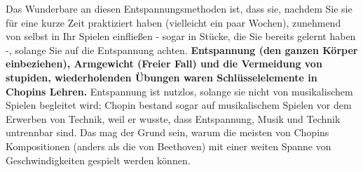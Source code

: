 Das Wunderbare an diesen Entspannungsmethoden ist, dass sie, nachdem Sie sie für eine kurze Zeit praktiziert haben (vielleicht ein paar Wochen), zunehmend von selbst in Ihr Spielen einfließen - sogar in Stücke, die Sie bereits gelernt haben -, solange Sie auf die Entspannung achten.
\textbf{Entspannung (den ganzen Körper einbeziehen), Armgewicht (Freier Fall) und die Vermeidung von stupiden, wiederholenden Übungen waren Schlüsselelemente in Chopins Lehren.}
Entspannung ist nutzlos, solange sie nicht von musikalischem Spielen begleitet wird; Chopin bestand sogar auf musikalischem Spielen vor dem Erwerben von Technik, weil er wusste, dass Entspannung, Musik und Technik untrennbar sind.
Das mag der Grund sein, warum die meisten von Chopins Kompositionen (anders als die von Beethoven) mit einer weiten Spanne von Geschwindigkeiten gespielt werden können.




